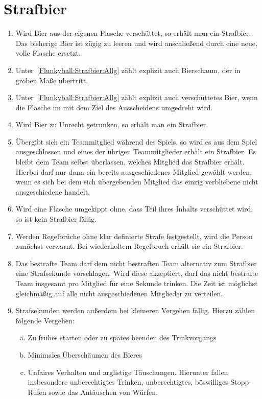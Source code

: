 \section{Strafbier}
\begin{enumerate}[label={(\arabic*)}]
    \item\label{Flunkyball:Strafbier:Allg}
    Wird Bier aus der eigenen Flasche verschüttet, so erhält man ein Strafbier.
    Das bisherige Bier ist zügig zu leeren und wird anschließend durch eine neue, volle Flasche ersetzt.

    \item
    Unter~\ref{Flunkyball:Strafbier:Allg} zählt explizit auch Bierschaum, der in groben Maße übertritt.

    \item
    Unter~\ref{Flunkyball:Strafbier:Allg} zählt explizit auch verschüttetes Bier, wenn die Flasche im mit dem Ziel des Ausscheidens umgedreht wird.

    \item
    Wird Bier zu Unrecht getrunken, so erhält man ein Strafbier.

    \item
    Übergibt sich ein Teammitglied während des Spiels, so wird es aus dem Spiel ausgeschlossen und eines der übrigen Teammitglieder erhält ein Strafbier.
    Es bleibt dem Team selbst überlassen, welches Mitglied das Strafbier erhält.
    Hierbei darf nur dann ein bereits ausgeschiedenes Mitglied gewählt werden, wenn es sich bei dem sich übergebenden Mitglied das einzig verbliebene nicht ausgeschiedene handelt.

    \item
    Wird eine Flasche umgekippt ohne, dass Teil ihres Inhalts verschüttet wird, so ist kein Strafbier fällig.

    \item
    Werden Regelbrüche ohne klar definierte Strafe festgestellt, wird die Person zunächst verwarnt.
    Bei wiederholtem Regelbruch erhält sie ein Strafbier.

    \item
    Das bestrafte Team darf dem nicht bestraften Team alternativ zum Strafbier eine Strafsekunde vorschlagen.
    Wird diese akzeptiert, darf das nicht bestrafte Team insgesamt pro Mitglied für eine Sekunde trinken.
    Die Zeit ist möglichst gleichmäßig auf alle nicht ausgeschiedenen Mitglieder zu verteilen.

    \item
    Strafsekunden werden außerdem bei kleineren Vergehen fällig.
    Hierzu zählen folgende Vergehen:
    \begin{enumerate}[a.]
        \item
        Zu frühes starten oder zu spätes beenden des Trinkvorgangs
        \item
        Minimales Überschäumen des Bieres
        \item
        Unfaires Verhalten und arglistige Täuschungen.
        Hierunter fallen insbesondere unberechtigtes Trinken, unberechtigtes, böswilliges \glqq{}Stopp\grqq{}-Rufen sowie das Antäuschen von Würfen.
    \end{enumerate}
\end{enumerate}
